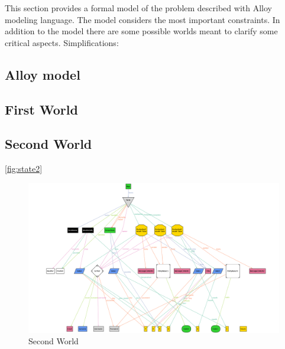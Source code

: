 
This section provides a formal model of the problem described with Alloy modeling language. 
The model considers the most important constraints. In addition to the model there are some 
possible worlds meant to clarify some critical aspects.
Simplifications: 

\subsection{Alloy model}


\subsection{First World}

\subsection{Second World}
\ref{fig:state2}


\begin{figure}
    \begin{center}
          \includegraphics[width=1.2\textwidth]{alloy/world2.png}
          \caption{Second World}
        \label{fig:world2}
    \end{center}
\end{figure}

